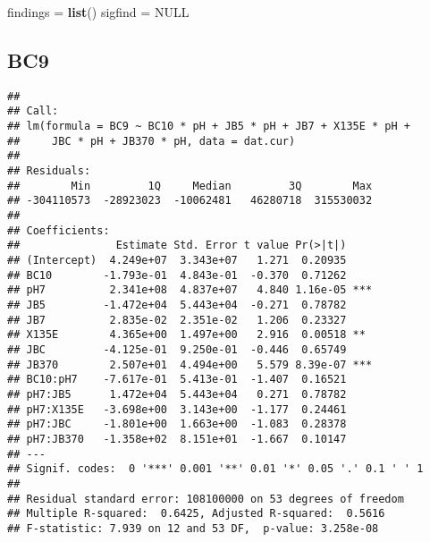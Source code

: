 \documentclass[
]{article}
\newenvironment{Shaded}{\begin{snugshade}}{\end{snugshade}}
\newcommand{\AttributeTok}[1]{\textcolor[rgb]{0.13,0.29,0.53}{#1}}
\newcommand{\ConstantTok}[1]{\textcolor[rgb]{0.56,0.35,0.01}{#1}}
\newcommand{\DecValTok}[1]{\textcolor[rgb]{0.00,0.00,0.81}{#1}}
\newcommand{\FunctionTok}[1]{\textcolor[rgb]{0.13,0.29,0.53}{\textbf{#1}}}
\newcommand{\NormalTok}[1]{#1}
\newcommand{\OtherTok}[1]{\textcolor[rgb]{0.56,0.35,0.01}{#1}}
\newcommand{\SpecialCharTok}[1]{\textcolor[rgb]{0.81,0.36,0.00}{\textbf{#1}}}
\begin{document}
\begin{Shaded}
\begin{Highlighting}[]
\NormalTok{findings }\OtherTok{=} \FunctionTok{list}\NormalTok{()}
\NormalTok{sigfind }\OtherTok{=} \ConstantTok{NULL}
\end{Highlighting}
\end{Shaded}

\hypertarget{bc9}{%
\subsection{BC9}\label{bc9}}

\begin{Shaded}
\end{Shaded}

\begin{verbatim}
## 
## Call:
## lm(formula = BC9 ~ BC10 * pH + JB5 * pH + JB7 + X135E * pH + 
##     JBC * pH + JB370 * pH, data = dat.cur)
## 
## Residuals:
##        Min         1Q     Median         3Q        Max 
## -304110573  -28923023  -10062481   46280718  315530032 
## 
## Coefficients:
##               Estimate Std. Error t value Pr(>|t|)    
## (Intercept)  4.249e+07  3.343e+07   1.271  0.20935    
## BC10        -1.793e-01  4.843e-01  -0.370  0.71262    
## pH7          2.341e+08  4.837e+07   4.840 1.16e-05 ***
## JB5         -1.472e+04  5.443e+04  -0.271  0.78782    
## JB7          2.835e-02  2.351e-02   1.206  0.23327    
## X135E        4.365e+00  1.497e+00   2.916  0.00518 ** 
## JBC         -4.125e-01  9.250e-01  -0.446  0.65749    
## JB370        2.507e+01  4.494e+00   5.579 8.39e-07 ***
## BC10:pH7    -7.617e-01  5.413e-01  -1.407  0.16521    
## pH7:JB5      1.472e+04  5.443e+04   0.271  0.78782    
## pH7:X135E   -3.698e+00  3.143e+00  -1.177  0.24461    
## pH7:JBC     -1.801e+00  1.663e+00  -1.083  0.28378    
## pH7:JB370   -1.358e+02  8.151e+01  -1.667  0.10147    
## ---
## Signif. codes:  0 '***' 0.001 '**' 0.01 '*' 0.05 '.' 0.1 ' ' 1
## 
## Residual standard error: 108100000 on 53 degrees of freedom
## Multiple R-squared:  0.6425, Adjusted R-squared:  0.5616 
## F-statistic: 7.939 on 12 and 53 DF,  p-value: 3.258e-08
\end{verbatim}
\end{document}
